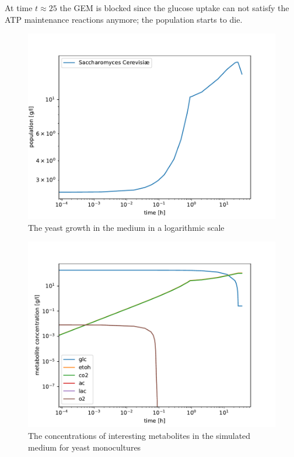 		At time $t\approx 25$ the GEM is blocked since the glucose uptake can not satisfy the ATP maintenance reactions anymore;
		the population starts to die.
		\begin{figure}[h]
			\centering
			\includegraphics[width=\linewidth]{figures/results/yeast/0lac_populations.pdf}
			\caption{The yeast growth in the medium in a logarithmic scale}
			\label{fig:yeast_0lac_pop}
		\end{figure}
		\begin{figure}[h]
			\centering
			\includegraphics[width=\linewidth]{figures/results/yeast/0lac_metabolites.pdf}
			\caption{The concentrations of interesting metabolites in the simulated medium for yeast monocultures}
			\label{fig:yeast_0lac_met}
		\end{figure}
		
